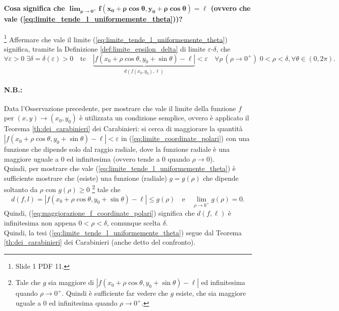 \paragraph{Cosa significa che $\boldsymbol{\lim_{\rho\rightarrow0^+}f(x_0+\rho\cos\theta, y_0+\rho\cos\theta)=\ell}$ (ovvero che vale (\ref{eq:limite_tende_l_uniformemente_theta}))?}

\begin{remark}\footnote{Slide 1 PDF 11.}
    Affermare che vale il limite (\ref{eq:limite_tende_l_uniformemente_theta}) significa, tramite la Definizione \ref{def:limite_epsilon_delta} di limite $\varepsilon$-$\delta$, che
    \begin{equation}\label{eq:limite_coordinate_polari}
        \forall\varepsilon>0\; \exists\delta=\delta(\varepsilon)>0\quad\text{tc}\quad \underbrace{|f(x_0+\rho\cos\theta,y_0+\sin\theta)-\ell|}_{d(f(x_0, y_0),\ell)}<\varepsilon\quad\forall\rho\,(\rho\rightarrow0^+)\;0<\rho<\delta,\forall\theta\in(0,2\pi).
    \end{equation}
\end{remark}

\paragraph{N.B.:} Data l'Osservazione precedente, per mostrare che vale il limite della funzione $f$ per $(x,y)\rightarrow (x_0,y_0)$ è utilizzata un condizione semplice, ovvero è applicato il Teorema \ref{th:dei_carabinieri} dei Carabinieri: si cerca di maggiorare la quantità $|f(x_0+\rho\cos\theta,y_0+\sin\theta)-\ell|<\varepsilon$ in (\ref{eq:limite_coordinate_polari}) con una funzione che dipende solo dal raggio radiale, dove la funzione radiale è una maggiore uguale a 0 ed infinitesima (ovvero tende a 0 quando $\rho\rightarrow 0$).\\
Quindi, per mostrare che vale (\ref{eq:limite_tende_l_uniformemente_theta}) è sufficiente mostrare che (esiste) una funzione (radiale) $g=g(\rho)$ che dipende soltanto da $\rho$ con $g(\rho)\geq 0$ \footnote{Tale che $g$ sia maggiore di $|f(x_0+\rho\cos\theta,y_0+\sin\theta)-\ell|$ ed infinitesima quando $\rho\rightarrow 0^+$. Quindi è sufficiente far vedere che $g$ esiste, che sia maggiore uguale a 0 ed infinitesima quando $\rho\rightarrow 0^+$.} tale che
\begin{equation}\label{eq:maggiorazione_f_coordinate_polari}
    d(f,l)=|f(x_0+\rho\cos\theta,y_0+\sin\theta)-\ell|\leq g(\rho)\quad\text{e}\quad\lim_{\rho\rightarrow 0^+}g(\rho)=0.
\end{equation}
Quindi, (\ref{eq:maggiorazione_f_coordinate_polari}) significa che $d(f,\ell)$ è infinitesima non appena $0<\rho<\delta$, comunque scelta $\delta$.\\
Quindi, la tesi (\ref{eq:limite_tende_l_uniformemente_theta}) segue dal Teorema \ref{th:dei_carabinieri} dei Carabinieri (anche detto del confronto).

